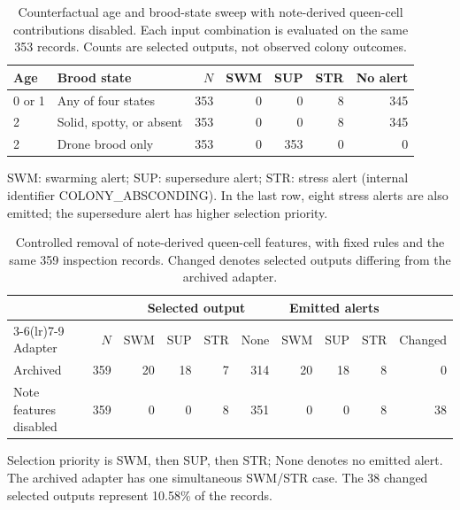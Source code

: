 \begin{table}[htbp]
\centering\small
\caption{Counterfactual age and brood-state sweep with note-derived queen-cell contributions disabled. Each input combination is evaluated on the same 353 records. Counts are selected outputs, not observed colony outcomes.}
\label{tab:representation-grid}
\begin{tabular}{llrrrrr}\toprule
Age & Brood state & $N$ & SWM & SUP & STR & No alert\\\midrule
0 or 1 & Any of four states & 353 & 0 & 0 & 8 & 345\\
2 & Solid, spotty, or absent & 353 & 0 & 0 & 8 & 345\\
2 & Drone brood only & 353 & 0 & 353 & 0 & 0\\
\bottomrule\end{tabular}
\par\smallskip\footnotesize SWM: swarming alert; SUP: supersedure alert; STR: stress alert (internal identifier COLONY\_ABSCONDING). In the last row, eight stress alerts are also emitted; the supersedure alert has higher selection priority.
\end{table}

\begin{table}[htbp]
\centering\small
\caption{Controlled removal of note-derived queen-cell features, with fixed rules and the same 359 inspection records. Changed denotes selected outputs differing from the archived adapter.}
\label{tab:adapter-ablation}
\begin{tabular}{lrrrrrrrrr}\toprule
 & & \multicolumn{4}{c}{Selected output} & \multicolumn{3}{c}{Emitted alerts} & \\
\cmidrule(lr){3-6}\cmidrule(lr){7-9}
Adapter & $N$ & SWM & SUP & STR & None & SWM & SUP & STR & Changed\\\midrule
Archived & 359 & 20 & 18 & 7 & 314 & 20 & 18 & 8 & 0\\
Note features disabled & 359 & 0 & 0 & 8 & 351 & 0 & 0 & 8 & 38\\
\bottomrule\end{tabular}
\par\smallskip\footnotesize Selection priority is SWM, then SUP, then STR; None denotes no emitted alert. The archived adapter has one simultaneous SWM/STR case. The 38 changed selected outputs represent 10.58\% of the records.
\end{table}

